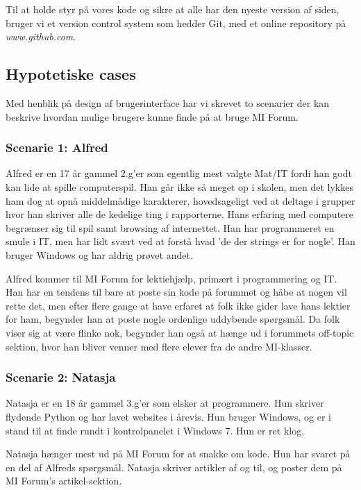 \documentclass{article}
\begin{document}
Til at holde styr på vores kode og sikre at alle har den nyeste version af siden, bruger vi et version control system som hedder Git, med et online repository på \emph{www.github.com}.

\subsection{Hypotetiske cases}

Med henblik på design af brugerinterface har vi skrevet to scenarier der kan beskrive hvordan mulige brugere kunne finde på at bruge MI Forum.

\subsubsection*{Scenarie 1: Alfred}
Alfred er en 17 år gammel 2.g'er som egentlig mest valgte Mat/IT fordi han godt kan lide at spille computerspil. Han går ikke så meget op i skolen, men det lykkes ham dog at opnå middelmådige karakterer, hovedsageligt ved at deltage i grupper hvor han skriver alle de kedelige ting i rapporterne. Hans erfaring med computere begrænser sig til spil samt browsing af internettet. Han har programmeret en smule i IT, men har lidt svært ved at forstå hvad 'de der strings er for nogle'. Han bruger Windows og har aldrig prøvet andet.

Alfred kommer til MI Forum for lektiehjælp, primært i programmering og IT. Han har en tendens til bare at poste sin kode på forummet og håbe at nogen vil rette det, men efter flere gange at have erfaret at folk ikke gider lave hans lektier for ham, begynder han at poste nogle ordenlige uddybende spørgsmål. Da folk viser sig at være flinke nok, begynder han også at hænge ud i forummets off-topic sektion, hvor han bliver venner med flere elever fra de andre MI-klasser.

\subsubsection*{Scenarie 2: Natasja}
Natasja er en 18 år gammel 3.g'er som elsker at programmere. Hun skriver flydende Python og har lavet websites i årevis. Hun bruger Windows, og er i stand til at finde rundt i kontrolpanelet i Windows 7. Hun er ret klog.

Natasja hænger mest ud på MI Forum for at snakke om kode. Hun har svaret på en del af Alfreds spørgsmål. Natasja skriver artikler af og til, og poster dem på MI Forum's artikel-sektion.
\end{document}
